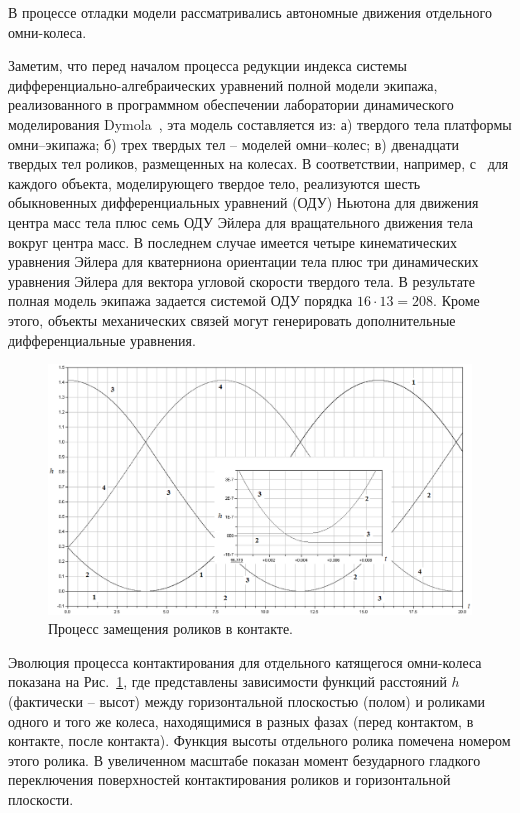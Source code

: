 
В процессе отладки модели рассматривались автономные движения отдельного 
омни-колеса.

Заметим, что перед началом процесса редукции индекса системы 
диф\-фе\-рен\-ци\-аль\-но-алгебраических уравнений полной модели экипажа, реализованного
в программном обеспечении лаборатории ди\-на\-ми\-чес\-ко\-го моделирования 
Dymola~\cite{Dymola}, эта модель составляется из: а) твердого тела платформы
омни--экипажа; б) трех твердых тел -- моделей омни--колес; в) двенадцати 
твердых тел роликов, размещенных на колесах. В соответствии, например, 
с~\cite{Kosenko2007} для каждого объекта, моделирующего твердое тело, 
реализуются шесть обыкновенных дифференциальных уравнений (ОДУ) Ньютона для
движения центра масс тела плюс семь ОДУ Эйлера для вращательного движения тела
вокруг центра масс. В последнем случае имеется четыре кинематических уравнения
Эйлера для кватерниона ориентации тела плюс три динамических уравнения Эйлера
для вектора угловой скорости твердого тела. В результате полная модель экипажа
задается системой ОДУ порядка $16\cdot 13=208$. Кроме этого, объекты 
механических связей могут генерировать дополнительные дифференциальные 
уравнения.

\begin{figure}[htb]
\centerline{\includegraphics[width=15cm]{content/parts/3_friction/nd/Figure11.eps}}
\caption{Процесс замещения роликов в контакте.}
\label{fig1}
\end{figure}

Эволюция процесса контактирования для отдельного катящегося омни-колеса 
показана на Рис.~\ref{fig1}, где представлены зависимости функций расстояний 
$h$ (фактически -- высот) между горизонтальной плоскостью (полом) и роликами 
одного и того же колеса, находящимися в разных фазах (перед контактом, в 
контакте, после контакта). Функция высоты отдельного ролика помечена номером 
этого ролика. В увеличенном масштабе показан момент безударного гладкого 
переключения поверхностей контактирования роликов и горизонтальной плоскости.

